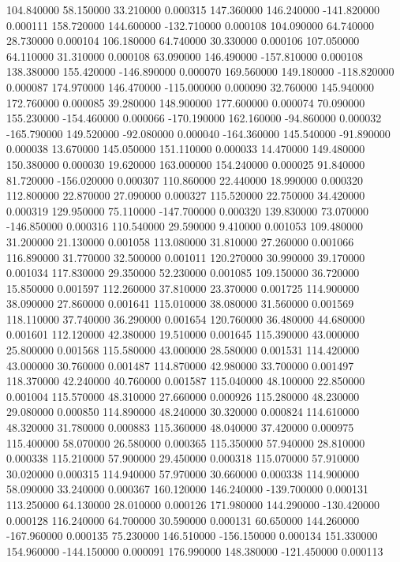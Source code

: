104.840000 58.150000 33.210000 0.000315 
147.360000 146.240000 -141.820000 0.000111 
158.720000 144.600000 -132.710000 0.000108 
104.090000 64.740000 28.730000 0.000104 
106.180000 64.740000 30.330000 0.000106 
107.050000 64.110000 31.310000 0.000108 
63.090000 146.490000 -157.810000 0.000108 
138.380000 155.420000 -146.890000 0.000070 
169.560000 149.180000 -118.820000 0.000087 
174.970000 146.470000 -115.000000 0.000090 
32.760000 145.940000 172.760000 0.000085 
39.280000 148.900000 177.600000 0.000074 
70.090000 155.230000 -154.460000 0.000066 
-170.190000 162.160000 -94.860000 0.000032 
-165.790000 149.520000 -92.080000 0.000040 
-164.360000 145.540000 -91.890000 0.000038 
13.670000 145.050000 151.110000 0.000033 
14.470000 149.480000 150.380000 0.000030 
19.620000 163.000000 154.240000 0.000025 
91.840000 81.720000 -156.020000 0.000307 
110.860000 22.440000 18.990000 0.000320 
112.800000 22.870000 27.090000 0.000327 
115.520000 22.750000 34.420000 0.000319 
129.950000 75.110000 -147.700000 0.000320 
139.830000 73.070000 -146.850000 0.000316 
110.540000 29.590000 9.410000 0.001053 
109.480000 31.200000 21.130000 0.001058 
113.080000 31.810000 27.260000 0.001066 
116.890000 31.770000 32.500000 0.001011 
120.270000 30.990000 39.170000 0.001034 
117.830000 29.350000 52.230000 0.001085 
109.150000 36.720000 15.850000 0.001597 
112.260000 37.810000 23.370000 0.001725 
114.900000 38.090000 27.860000 0.001641 
115.010000 38.080000 31.560000 0.001569 
118.110000 37.740000 36.290000 0.001654 
120.760000 36.480000 44.680000 0.001601 
112.120000 42.380000 19.510000 0.001645 
115.390000 43.000000 25.800000 0.001568 
115.580000 43.000000 28.580000 0.001531 
114.420000 43.000000 30.760000 0.001487 
114.870000 42.980000 33.700000 0.001497 
118.370000 42.240000 40.760000 0.001587 
115.040000 48.100000 22.850000 0.001004 
115.570000 48.310000 27.660000 0.000926 
115.280000 48.230000 29.080000 0.000850 
114.890000 48.240000 30.320000 0.000824 
114.610000 48.320000 31.780000 0.000883 
115.360000 48.040000 37.420000 0.000975 
115.400000 58.070000 26.580000 0.000365 
115.350000 57.940000 28.810000 0.000338 
115.210000 57.900000 29.450000 0.000318 
115.070000 57.910000 30.020000 0.000315 
114.940000 57.970000 30.660000 0.000338 
114.900000 58.090000 33.240000 0.000367 
160.120000 146.240000 -139.700000 0.000131 
113.250000 64.130000 28.010000 0.000126 
171.980000 144.290000 -130.420000 0.000128 
116.240000 64.700000 30.590000 0.000131 
60.650000 144.260000 -167.960000 0.000135 
75.230000 146.510000 -156.150000 0.000134 
151.330000 154.960000 -144.150000 0.000091 
176.990000 148.380000 -121.450000 0.000113 
